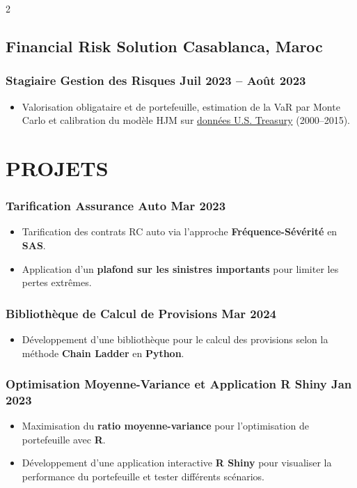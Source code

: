 \documentclass[11pt,asfal]{amdresume}
\begin{document}
\begin{paracol}{2}
\subsection{Financial Risk Solution \hfill Casablanca, Maroc}
\subsubsection{Stagiaire Gestion des Risques \dotfill Juil 2023 – Août 2023}
\begin{itemize}
\item Valorisation obligataire et de portefeuille, estimation de la VaR par Monte Carlo et calibration du modèle HJM sur \href{https://www.federalreserve.gov/econres/feds/the-us-treasury-yield-curve-1961-to-the-present.htm}{données U.S. Treasury} (2000–2015).
\end{itemize}

\section{PROJETS}

\subsubsection{Tarification Assurance Auto \dotfill Mar 2023}
\begin{itemize}
    \item Tarification des contrats RC auto via l’approche \textbf{Fréquence-Sévérité} en \textbf{SAS}.
    \item Application d’un \textbf{plafond sur les sinistres importants} pour limiter les pertes extrêmes.
\end{itemize}

\subsubsection{Bibliothèque de Calcul de Provisions \dotfill Mar 2024}
\begin{itemize}
    \item Développement d’une bibliothèque pour le calcul des provisions selon la méthode \textbf{Chain Ladder} en \textbf{Python}.
\end{itemize}

\subsubsection{Optimisation Moyenne-Variance et Application R Shiny \dotfill Jan 2023}
\begin{itemize}
    \item Maximisation du \textbf{ratio moyenne-variance} pour l’optimisation de portefeuille avec \textbf{R}.
    \item Développement d’une application interactive \textbf{R Shiny} pour visualiser la performance du portefeuille et tester différents scénarios.
\end{itemize}


\end{paracol}
\end{document}
